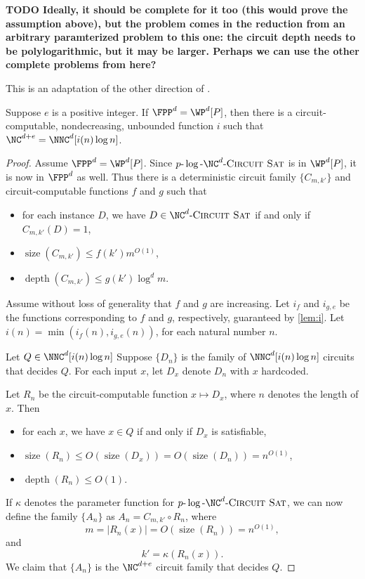 \documentclass{article}
\newcommand{\todo}[1]{\textbf{TODO #1}}
\newcommand{\dash}{\textnormal{-}}
\newcommand{\pncsat}{p\dash\log\dash\NC^d\dash\textsc{Circuit Sat}}
\DeclareMathOperator{\depth}{depth}
\DeclareMathOperator{\size}{size}
\begin{document}
\todo{
  Ideally, it should be complete for it too (this would prove the assumption above), but the problem comes in the reduction from an arbitrary paramterized problem to this one: the circuit depth needs to be polylogarithmic, but it may be larger.
  Perhaps we can use the other complete problems from \autocite{cc97} here?
}

This is an adaptation of the other direction of \autocite[Theorem~3.29]{fg06}.

\begin{theorem}
  Suppose $e$ is a positive integer.
  If $\FPP^d = \WP^d[P]$, then there is a circuit-computable, nondecreasing, unbounded function $i$ such that $\NC^{d + e} = \NNC^d[i(n) \log n]$.
\end{theorem}
\begin{proof}
  Assume $\FPP^d = \WP^d[P]$.
  Since $\pncsat$ is in $\WP^d[P]$, it is now in $\FPP^d$ as well.
  Thus there is a deterministic circuit family $\{C_{m, k'}\}$ and circuit-computable functions $f$ and $g$ such that
  \begin{itemize}
  \item for each instance $D$, we have $D \in \NC^d\textnormal{-}\textsc{Circuit Sat}$ if and only if $C_{m, k'}(D) = 1$,
  \item $\size(C_{m, k'}) \leq f(k') m^{O(1)}$,
  \item $\depth(C_{m, k'}) \leq g(k') \log^d m$.
  \end{itemize}
  Assume without loss of generality that $f$ and $g$ are increasing.
  Let $i_f$ and $i_{g, e}$ be the functions corresponding to $f$ and $g$, respectively, guaranteed by \autoref{lem:i}.
  Let $i(n) = \min(i_f(n), i_{g, e}(n))$, for each natural number $n$.

  Let $Q \in \NNC^d[i(n) \log n]$
  Suppose $\{D_n\}$ is the family of $\NNC^d[i(n) \log n]$ circuits that decides $Q$.
  For each input $x$, let $D_x$ denote $D_n$ with $x$ hardcoded.

  Let $R_n$ be the circuit-computable function $x \mapsto D_x$, where $n$ denotes the length of $x$.
  Then
  \begin{itemize}
  \item for each $x$, we have $x \in Q$ if and only if $D_x$ is satisfiable,
  \item $\size(R_n) \leq O(\size(D_x)) = O(\size(D_n)) = n^{O(1)}$,
  \item $\depth(R_n) \leq O(1)$.
  \end{itemize}
  If $\kappa$ denotes the parameter function for $\pncsat$, we can now define the family $\{A_n\}$ as $A_n = C_{m, k'} \circ R_n$, where
  \[
  m = |R_n(x)| = O(\size(R_n)) = n^{O(1)},
  \]
  and
  \[
  k' = \kappa(R_n(x)).
  \]
  We claim that $\{A_n\}$ is the $\NC^{d + e}$ circuit family that decides $Q$.


\end{proof}
\end{document}
